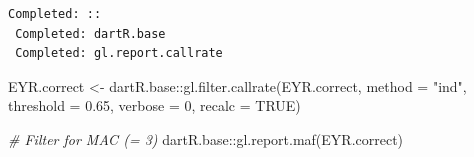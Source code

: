 \documentclass[
  letterpaper,
  DIV=11,
  numbers=noendperiod]{scrreprt}
\newenvironment{Shaded}{\begin{snugshade}}{\end{snugshade}}
\newcommand{\AttributeTok}[1]{\textcolor[rgb]{0.49,0.56,0.16}{#1}}
\newcommand{\CommentTok}[1]{\textcolor[rgb]{0.38,0.63,0.69}{\textit{#1}}}
\newcommand{\ConstantTok}[1]{\textcolor[rgb]{0.53,0.00,0.00}{#1}}
\newcommand{\DecValTok}[1]{\textcolor[rgb]{0.25,0.63,0.44}{#1}}
\newcommand{\FloatTok}[1]{\textcolor[rgb]{0.25,0.63,0.44}{#1}}
\newcommand{\FunctionTok}[1]{\textcolor[rgb]{0.02,0.16,0.49}{#1}}
\newcommand{\NormalTok}[1]{\textcolor[rgb]{0.00,0.44,0.13}{#1}}
\newcommand{\OtherTok}[1]{\textcolor[rgb]{0.00,0.44,0.13}{#1}}
\newcommand{\SpecialCharTok}[1]{\textcolor[rgb]{0.25,0.44,0.63}{#1}}
\newcommand{\StringTok}[1]{\textcolor[rgb]{0.25,0.44,0.63}{#1}}
\begin{document}
\begin{verbatim}
Completed: :: 
 Completed: dartR.base 
 Completed: gl.report.callrate 
\end{verbatim}

\begin{Shaded}
\begin{Highlighting}[]
\NormalTok{EYR.correct }\OtherTok{\textless{}{-}}\NormalTok{ dartR.base}\SpecialCharTok{::}\FunctionTok{gl.filter.callrate}\NormalTok{(EYR.correct, }\AttributeTok{method =} \StringTok{"ind"}\NormalTok{,}
    \AttributeTok{threshold =} \FloatTok{0.65}\NormalTok{, }\AttributeTok{verbose =} \DecValTok{0}\NormalTok{, }\AttributeTok{recalc =} \ConstantTok{TRUE}\NormalTok{)}
\end{Highlighting}
\end{Shaded}

\begin{Shaded}
\begin{Highlighting}[]
\CommentTok{\# Filter for MAC (= 3)}
\NormalTok{dartR.base}\SpecialCharTok{::}\FunctionTok{gl.report.maf}\NormalTok{(EYR.correct)}
\end{Highlighting}
\end{Shaded}
\end{document}
